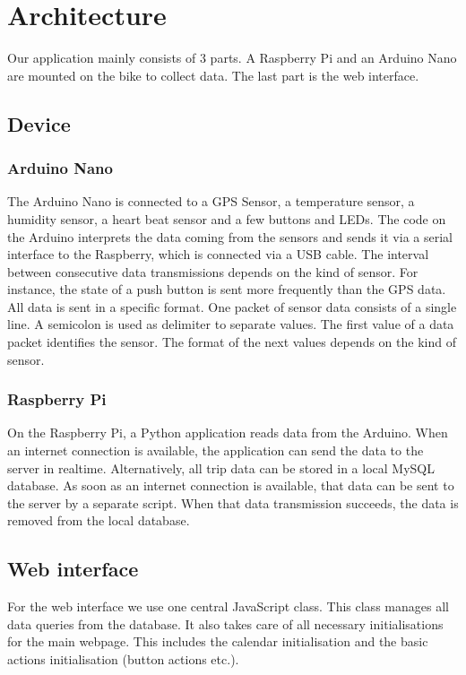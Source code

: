 \section{Architecture}
Our application mainly consists of 3 parts. 
A Raspberry Pi and an Arduino Nano are mounted on the bike to collect data. 
The last part is the web interface.
\subsection{Device}
\subsubsection{Arduino Nano}
The Arduino Nano is connected to a GPS Sensor, a temperature sensor, a humidity sensor, a heart beat sensor and a few buttons and LEDs. 
The code on the Arduino interprets the data coming from the sensors and sends it via a serial interface to the Raspberry, which is connected via a USB cable.
The interval between consecutive data transmissions depends on the kind of sensor. 
For instance, the state of a push button is sent more frequently than the GPS data.
All data is sent in a specific format. One packet of sensor data consists of a single line.
A semicolon is used as delimiter to separate values. The first value of a data packet identifies the sensor. 
The format of the next values depends on the kind of sensor.
\subsubsection{Raspberry Pi}
On the Raspberry Pi, a Python application reads data from the Arduino. 
When an internet connection is available, the application can send the data to the server in realtime.
Alternatively, all trip data can be stored in a local MySQL database. 
As soon as an internet connection is available, that data can be sent to the server by a separate script.
When that data transmission succeeds, the data is removed from the local database.
\subsection{Web interface}
For the web interface we use one central JavaScript class. This class manages all data queries from the database.
It also takes care of all necessary initialisations for the main webpage. This includes the calendar initialisation and
the basic actions initialisation (button actions etc.).

